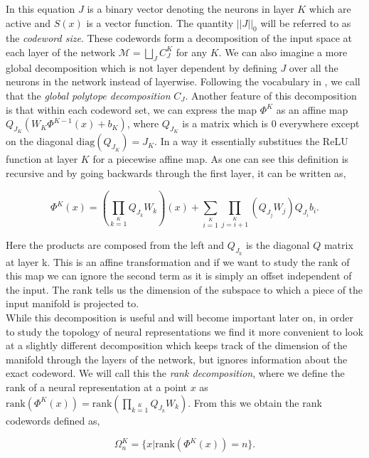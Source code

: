 In this equation $J$ is a binary vector denoting the neurons in layer $K$ which are active and $S(x)$ is a vector function. The quantity $||J||_0$ will be referred to as the \textit{codeword size}. These codewords form a decomposition of the input space at each layer of the network $\mathcal{M} = \bigsqcup\limits_{J}C_J^K$ for any $K$. We can also imagine a more global decomposition which is not layer dependent by defining $J$ over all the neurons in the network instead of layerwise. Following the vocabulary in \cite{hanin2019deep}, we call that the \textit{global polytope decomposition} $C_J$. Another feature of this decomposition is that within each codeword set, we can express the map $\Phi^K$ as an affine map $Q_{J_K}(W_K\Phi^{K-1}(x)+b_K)$, where $Q_{J_K}$ is a matrix which is 0 everywhere except on the diagonal $\text{diag}(Q_{J_K}) = J_K$. In a way it essentially substitues the ReLU function at layer $K$ for a piecewise affine map. As one can see this definition is recursive and by going backwards through the first layer, it can be written as,

\begin{equation}
    \label{eq: Phi rank}
    \Phi^K(x) = (\prod\limits_{k=1}\limits^{K} Q_{J_k}W_k)(x)+\sum\limits_{i=1}\limits^{K} \prod\limits_{j=i+1}\limits^{K} (Q_{J_j}W_j) Q_{J_i}b_i.
\end{equation}

Here the products are composed from the left and $Q_{J_k}$ is the diagonal $Q$ matrix at layer k. This is an affine transformation and if we want to study the rank of this map we can ignore the second term as it is simply an offset independent of the input. The rank tells us the dimension of the subspace to which a piece of the input manifold is projected to.\\

While this decomposition is useful and will become important later on, in order to study the topology of neural representations we find it more convenient to look at a slightly different decomposition which keeps track of the dimension of the manifold through the layers of the network, but ignores information about the exact codeword. We will call this the \textit{rank decomposition}, where we define the rank of a neural representation at a point $x$ as $\text{rank}(\Phi^K(x))=\text{rank}(\prod\limits_{k=1}\limits^{K} Q_{J_k}W_k)$. From this we obtain the rank codewords defined as,

\begin{equation}
    \Omega^K_n = \{x | \text{rank}(\Phi^K(x)) = n\}.
\end{equation}

